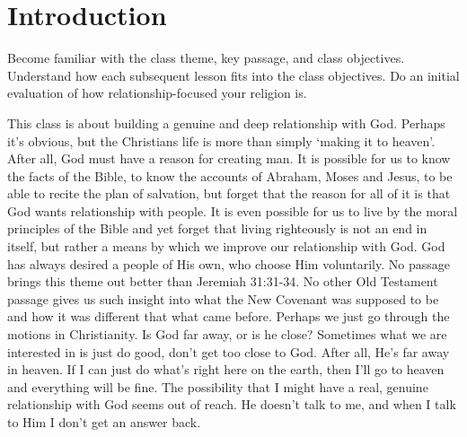 \chapter{Introduction}

\begin{goals}
\goal Become familiar with the class theme, key passage, and class objectives.
\goal Understand how each subsequent lesson fits into the class objectives.
\goal Do an initial evaluation of how relationship-focused your religion is.
\end{goals}

\begin{intro}
This class is about building a genuine and deep relationship with God.  Perhaps it's obvious, but the Christians life is more than simply `making it to heaven'.  After all, God must have a reason for creating man.  It is possible for us to know the facts of the Bible, to know the accounts of Abraham, Moses and Jesus, to be able to recite the plan of salvation, but forget that the reason for all of it is that God wants relationship with people.  It is even possible for us to live by the moral principles of the Bible and yet forget that living righteously is not an end in itself, but rather a means by which we improve our relationship with God.  God has always desired a people of His own, who choose Him voluntarily.  No passage brings this theme out better than Jeremiah 31:31-34.  No other Old Testament passage gives us such insight into what the New Covenant was supposed to be and how it was different that what came before.  Perhaps we just go through the motions in Christianity.  Is God far away, or is he close?  Sometimes what we are interested in is just do good, don't get too close to God.  After all, He's far away in heaven.  If I can just do what's right here on the earth, then I'll go to heaven and everything will be fine.  The possibility that I might have a real, genuine relationship with God seems out of reach.  He doesn't talk to me, and when I talk to Him I don't get an answer back.  
\end{intro}

